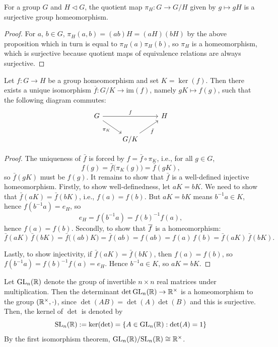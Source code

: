 \begin{propbox}
    For a group $G$ and $H \triangleleft  G$, the quotient map $\pi_H : G \to G/H$ given by $g \mapsto gH$ is a surjective group homeomorphism. 
\end{propbox}
\begin{proof}
    For $a$, $b \in G$, $\pi_H(a,b) = (ab)H = (aH)(bH)$ by the above proposition which in turn is equal to $\pi_H(a)\pi_H(b)$, so $\pi_H$ is a homeomorphism, which is surjective because quotient maps of equivalence relations are always surjective.
\end{proof}

\begin{thmbox}
    Let $f \colon G \to H$ be a group homeomorphism and set $K = \ker(f)$. Then there exists a unique isomorphism $\overline{f} \colon G/K \to \text{im}(f)$, namely $gK \mapsto f(g)$, such that the following diagram commutes:
    \[
    \begin{tikzcd}
        G \arrow[rr, "f"] \arrow[dr, "\pi_K"'] & & H \\
        & G/K \arrow[ur, "\bar{f}"'] &
    \end{tikzcd}
    \]
\end{thmbox}

\begin{proof}
    The uniqueness of $\bar{f}$ is forced by $f = \bar{f} \circ \pi_K$, i.e., for all $g \in G$,
    \[
    f(g) = \bar{f}\big(\pi_K(g)\big) = \bar{f}(gK),
    \]
    so $\bar{f}(gK)$ must be $f(g)$. It remains to show that $\bar{f}$ is a well-defined injective homeomorphism. Firstly, to show well-definedness, let $aK = bK$. We need to show that $\bar{f}(aK) = \bar{f}(bK)$, i.e., $f(a) = f(b)$. But $aK = bK$ means $b^{-1}a \in K$, hence $f(b^{-1}a) = e_H$, so
    \[
    e_H = f(b^{-1}a) = f(b)^{-1} f(a),
    \]
    hence $f(a) = f(b)$. Secondly, to show that $\overline{f}$ is a homeomorphism:
    \[
    \bar{f}(aK)\,\bar{f}(bK) = \bar{f}\big((ab)K\big) = \bar{f}(ab) = f(ab) = f(a)\,f(b) = \bar{f}(aK)\,\bar{f}(bK).
    \]
    
    Lastly, to show injectivity, if $\bar{f}(aK) = \bar{f}(bK)$, then $f(a) = f(b)$, so $f(b^{-1}a) = f(b)^{-1} f(a) = e_H$. Hence $b^{-1}a \in K$, so $aK = bK$.
\end{proof}

\begin{example}
    Let $\text{GL}_n(\mathbb{R})$ denote the group of invertible $n \times n$ real matrices under multiplication. Then the determinant $\det \text{GL}_n(\mathbb{R}) \to \mathbb{R}^\times$ is a homeomorphism to the group $(\mathbb{R}^\times, \cdot)$, since $\det(AB) = \det(A)\det(B)$ and this is surjective. Then, the kernel of $\det$ is denoted by 
    \[ \text{SL}_n(\mathbb{R}) := \ker(\det) = \{ A \in \text{GL}_n(\mathbb{R}) : \det(A) = 1 \} \]
    By the first isomorphism theorem, $\text{GL}_n(\mathbb{R})/\text{SL}_n(\mathbb{R}) \cong \mathbb{R}^\times$. 
\end{example}